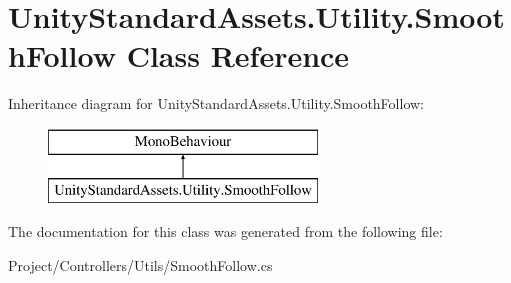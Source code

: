 \hypertarget{class_unity_standard_assets_1_1_utility_1_1_smooth_follow}{}\section{Unity\+Standard\+Assets.\+Utility.\+Smooth\+Follow Class Reference}
\label{class_unity_standard_assets_1_1_utility_1_1_smooth_follow}
Inheritance diagram for Unity\+Standard\+Assets.\+Utility.\+Smooth\+Follow\+:\begin{figure}[H]
\begin{center}
\leavevmode
\includegraphics[height=2.000000cm]{class_unity_standard_assets_1_1_utility_1_1_smooth_follow}
\end{center}
\end{figure}


The documentation for this class was generated from the following file\+:\begin{DoxyCompactItemize}
\item 
Project/\+Controllers/\+Utils/Smooth\+Follow.\+cs\end{DoxyCompactItemize}
